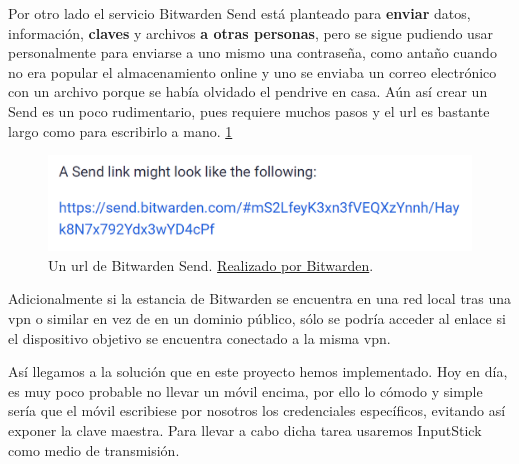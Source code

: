 Por otro lado el servicio Bitwarden Send\cite{sendblog} está planteado para \textbf{enviar} datos, información, \textbf{claves} y archivos \textbf{a otras personas}, pero se sigue pudiendo usar personalmente para enviarse a uno mismo una contraseña, como antaño cuando no era popular el almacenamiento online y uno se enviaba un correo electrónico con un archivo porque se había olvidado el pendrive en casa. Aún así crear un Send es un poco rudimentario, pues requiere muchos pasos y el \gls{url} es bastante largo como para escribirlo a mano. \ref{fig:send-link}
\begin{figure}[H]
    \centering
    \includegraphics[width=\textwidth]{gfx/send-link.png}
    \caption{Un \gls{url} de Bitwarden Send. \href{https://bitwarden.com/blog/bitwarden-send-how-it-works/}{Realizado por Bitwarden}.}
    \label{fig:send-link}
\end{figure}
Adicionalmente si la estancia de Bitwarden se encuentra en una red local tras una \gls{vpn} o similar en vez de en un dominio público, sólo se podría acceder al enlace si el dispositivo objetivo se encuentra conectado a la misma \gls{vpn}.

Así llegamos a la solución que en este proyecto hemos implementado. Hoy en día, es muy poco probable no llevar un móvil encima, por ello lo cómodo y simple sería que el móvil escribiese por nosotros los credenciales específicos, evitando así exponer la clave maestra. Para llevar a cabo dicha tarea usaremos InputStick como medio de transmisión.